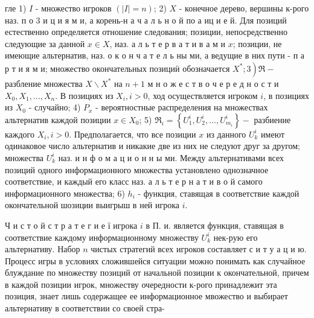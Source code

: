 \documentclass[10pt]{article}
\begin{document}
гле 1) $I$ - множество игроков $(|I|=n)$; 2) $X$ - конечное дерево, вершины к-рого наз. п о 3 и ц и я м и, а корень-н а ч а л ь н о й по $а$ иц и е й. Для позиций естественно определяется отношение следования; позиции, непосредственно следующие за данной $x \in X$, наз. а л ь т е р в а т и в а м и $x$; позиции, не имеющие альтернатив, наз. о к о н ч а т е л ь ны ми, а ведущие в них пути - п а р т и я м и; множество окончательных позициӥ обозначается $\left.X^{*} ; 3\right) \mathfrak{R}-$ разбление множества $X \backslash X^{*}$ на $n+1$ м н о ж е с т в о ч е р е д н о с т и $X_{0}, X_{1}, \ldots, X_{n}$. В позициях из $X_{i}, i>0$, ход осуществляется игроком $i$, в позициях из $X_{0}$ - случайно; 4) $P_{x}$ - вероятностные распределения на множествах альтернатив каждой позиции $x \in X_{0}$; 5) $\mathfrak{R}_{i}=\left\{U_{1}^{i}, U_{2}^{i}, \ldots, U_{m_{i}}^{i}\right\}-$ разбиение каждого $X_{i}, i>0$. Предполагается, что все позиции $x$ из данного $U_{k}^{i}$ имеют одинаковое число альтернатив и никакие две из них не следуют друг за другом; множества $U_{k}^{i}$ наз. и н ф о м а ц и о н н ы ми. Между альтернативами всех позиций одного информационного множества установлено однозначное соответствие, и каждый его класс наз. а л ь т е р н а т и в о й самого информационного множества; 6) $h_{i}$ - функция, ставящая в соответствие каждой окончательной шозиции выигрыш в ней игрока $i$.



Ч и с т о й с т р а т е г и е ї игрока $i$ в П. и. является функция, ставящая в соответствие каждому информационному множеству $U_{k}^{i}$ нек-рую его альтернативу. Набор $n$ чистых стратегий всех игроков составляет с и т у а ц и ю. Процесс игры в условиях сложившейся ситуации можно понимать как случайное блуждание по множеству позиций от начальной позиции к окончательной, причем в каждой позиции игрок, множеству очередности к-рого принадлежит эта позиция, знает лишь содержащее ее информационное мвожество и выбирает альтернативу в соответствии со своей стра-
\end{document}
